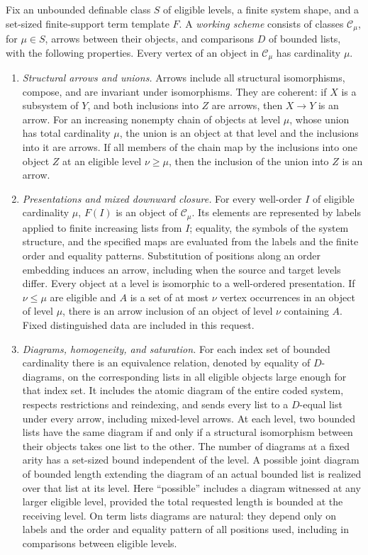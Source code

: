 \begin{definition}
\label{lev:working-package}
Fix an unbounded definable class $S$ of eligible levels, a finite system
shape, and a set-sized finite-support term template $F$.  A
\emph{working scheme} consists of classes $\mathcal C_\mu$, for $\mu\in S$,
arrows between their objects, and comparisons $D$ of bounded lists,
with the following properties.  Every vertex of an object in
$\mathcal C_\mu$ has cardinality $\mu$.
\begin{enumerate}
\item \emph{Structural arrows and unions.}
Arrows include all structural isomorphisms, compose, and are invariant
under isomorphisms.  They are coherent: if $X$ is a subsystem of $Y$,
and both inclusions into $Z$ are arrows, then $X\to Y$ is an arrow.
For an increasing nonempty chain of objects at level $\mu$, whose
union has total cardinality $\mu$, the union is an object at that level
and the inclusions into it are arrows.  If all members of the chain
map by the inclusions into one object $Z$ at an eligible level
$\nu\geq\mu$, then the inclusion of the union into $Z$ is an arrow.

\item \emph{Presentations and mixed downward closure.}
For every well-order $I$ of eligible cardinality $\mu$, $F(I)$ is an
object of $\mathcal C_\mu$.  Its elements are represented by labels
applied to finite increasing lists from $I$; equality, the symbols of
the system structure, and the specified maps are evaluated from the
labels and the finite order and equality patterns.  Substitution of
positions along an order embedding induces an arrow, including when
the source and target levels differ.  Every object at a level is
isomorphic to a well-ordered presentation.  If $\nu\leq\mu$ are eligible
and $A$ is a set of at most $\nu$ vertex occurrences in an object of
level $\mu$, there is an arrow inclusion of an object of level $\nu$
containing $A$.  Fixed distinguished data are included in this request.

\item \emph{Diagrams, homogeneity, and saturation.}
For each index set of bounded cardinality there is an equivalence
relation, denoted by equality of $D$-diagrams, on the corresponding
lists in all eligible objects large enough for that index set.
It includes the atomic diagram of the entire coded system, respects
restrictions and reindexing, and sends every list to a $D$-equal list
under every arrow, including mixed-level arrows.  At each level,
two bounded lists have the same diagram if and only if a structural
isomorphism between their objects takes one list to the other.
The number of diagrams at a fixed arity has a set-sized bound
independent of the level.  A possible joint diagram of bounded length
extending the diagram of an actual bounded list is realized over that
list at its level.  Here ``possible'' includes a diagram witnessed at
any larger eligible level, provided the total requested length is
bounded at the receiving level.  On term lists diagrams are natural:
they depend only on labels and the order and equality pattern of all
positions used, including in comparisons between eligible levels.


\end{enumerate}
\end{definition}
